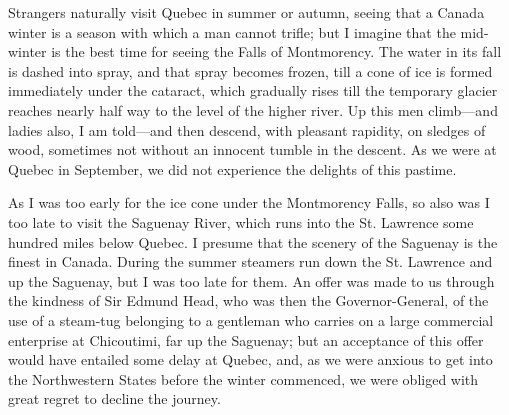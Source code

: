 Strangers naturally visit Quebec in summer or autumn, seeing that a
Canada winter is a season with which a man cannot trifle; but I
imagine that the mid-winter is the best time for seeing the Falls
of Montmorency.  The water in its fall is dashed into spray, and
that spray becomes frozen, till a cone of ice is formed immediately
under the cataract, which gradually rises till the temporary
glacier reaches nearly half way to the level of the higher river.
Up this men climb---and ladies also, I am told---and then descend,
with pleasant rapidity, on sledges of wood, sometimes not without
an innocent tumble in the descent.  As we were at Quebec in
September, we did not experience the delights of this pastime.

As I was too early for the ice cone under the Montmorency Falls, so
also was I too late to visit the Saguenay River, which runs into
the St. Lawrence some hundred miles below Quebec.  I presume that
the scenery of the Saguenay is the finest in Canada.  During the
summer steamers run down the St. Lawrence and up the Saguenay, but
I was too late for them.  An offer was made to us through the
kindness of Sir Edmund Head, who was then the Governor-General, of
the use of a steam-tug belonging to a gentleman who carries on a
large commercial enterprise at Chicoutimi, far up the Saguenay; but
an acceptance of this offer would have entailed some delay at
Quebec, and, as we were anxious to get into the Northwestern States
before the winter commenced, we were obliged with great regret to
decline the journey.

